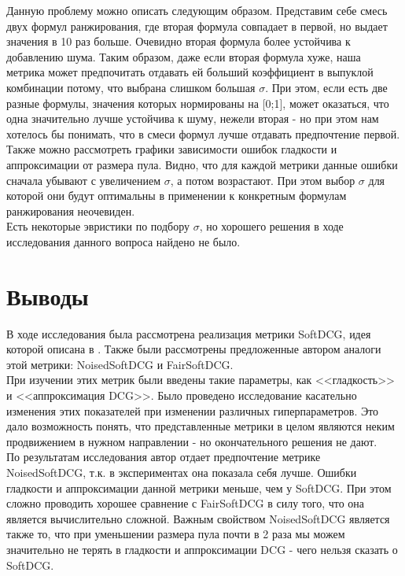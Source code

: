 \documentclass[14pt,a4paper]{amsart}
\theoremstyle{definition}
\theoremstyle{definition}
\begin{document}
Данную проблему можно описать следующим образом. Представим себе смесь двух формул ранжирования, где вторая формула совпадает в первой, но выдает значения в 10 раз больше. Очевидно вторая формула более устойчива к добавлению шума. Таким образом, даже если вторая формула хуже, наша метрика может предпочитать отдавать ей больший коэффициент в выпуклой комбинации потому, что выбрана слишком большая $\sigma$. При этом, если есть две разные формулы, значения которых нормированы на [0;1], может оказаться, что одна значительно лучше устойчива к шуму, нежели вторая - но при этом нам хотелось бы понимать, что в смеси формул лучше отдавать предпочтение первой. \\

Также можно рассмотреть графики зависимости ошибок гладкости и аппроксимации от размера пула. Видно, что для каждой метрики данные ошибки сначала убывают с увеличением $\sigma$, а потом возрастают. При этом выбор $\sigma$ для которой они будут оптимальны в применении к конкретным формулам ранжирования неочевиден. \\

Есть некоторые эвристики по подбору $\sigma$, но хорошего решения в ходе исследования данного вопроса найдено не было.


\newpage
\section{Выводы}

В ходе исследования была рассмотрена реализация метрики SoftDCG, идея которой описана в \cite{SoftDCGPaper}. Также были рассмотрены предложенные автором аналоги этой метрики: NoisedSoftDCG и FairSoftDCG. \\

При изучении этих метрик были введены такие параметры, как <<гладкость>> и <<аппроксимация DCG>>. Было проведено исследование касательно изменения этих показателей при изменении различных гиперпараметров. Это дало возможность понять, что представленные метрики в целом являются неким продвижением в нужном направлении - но окончательного решения не дают. \\

По результатам исследования автор отдает предпочтение метрике NoisedSoftDCG, т.к. в экспериментах она показала себя лучше. Ошибки гладкости и аппроксимации данной метрики меньше, чем у SoftDCG. При этом сложно проводить хорошее сравнение с FairSoftDCG в силу того, что она является вычислительно сложной. Важным свойством NoisedSoftDCG является также то, что при уменьшении размера пула почти в 2 раза мы можем значительно не терять в гладкости и аппроксимации DCG - чего нельзя сказать о SoftDCG. \\
\end{document}
